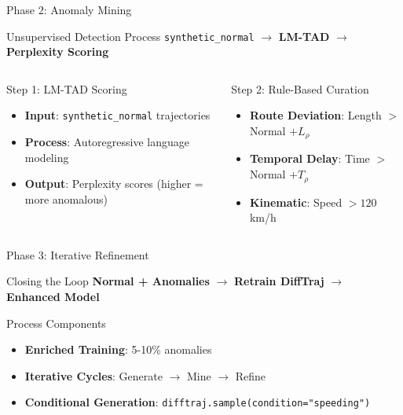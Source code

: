 \documentclass[aspectratio=169,xcolor={dvipsnames}]{beamer}
\newcommand{\code}[1]{\texttt{\small #1}}
\begin{document}
\begin{frame}{Phase 2: Anomaly Mining}
  \begin{block}{Unsupervised Detection Process}
    \centering
    \code{synthetic\_normal} $\rightarrow$ \textbf{LM-TAD} $\rightarrow$ \textbf{Perplexity Scoring}
  \end{block}
  
  \vspace{1em}
  \begin{columns}
    \begin{column}{0.5\textwidth}
      \begin{block}{Step 1: LM-TAD Scoring}
        \begin{itemize}
          \item \textbf{Input}: \code{synthetic\_normal} trajectories
          \item \textbf{Process}: Autoregressive language modeling
          \item \textbf{Output}: Perplexity scores (higher = more anomalous)
        \end{itemize}
      \end{block}
    \end{column}
    \begin{column}{0.5\textwidth}
      \begin{block}{Step 2: Rule-Based Curation}
        \begin{itemize}
          \item \textbf{Route Deviation}: Length $>$ Normal $+ L_\rho$
          \item \textbf{Temporal Delay}: Time $>$ Normal $+ T_\rho$
          \item \textbf{Kinematic}: Speed $> 120$ km/h
        \end{itemize}
      \end{block}
    \end{column}
  \end{columns}
\end{frame}

\begin{frame}{Phase 3: Iterative Refinement}
  \begin{block}{Closing the Loop}
    \centering
    \textbf{Normal + Anomalies} $\rightarrow$ \textbf{Retrain DiffTraj} $\rightarrow$ \textbf{Enhanced Model}
  \end{block}
  
  \vspace{1em}
  \begin{block}{Process Components}
    \begin{itemize}
      \item \textbf{Enriched Training}: 5-10\% anomalies
      \item \textbf{Iterative Cycles}: Generate $\rightarrow$ Mine $\rightarrow$ Refine
      \item \textbf{Conditional Generation}: \code{difftraj.sample(condition="speeding")}
    \end{itemize}
  \end{block}
\end{frame}
\end{document}
